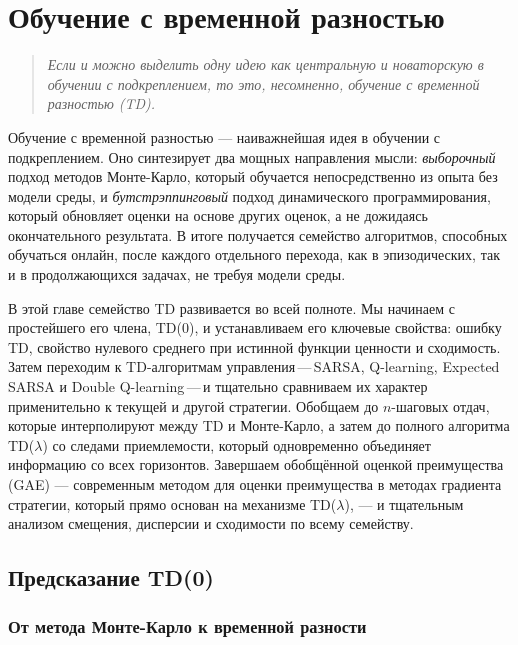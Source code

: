 \chapter{Обучение с временной разностью}
\label{ch:td}

\begin{quote}
\itshape
Если и можно выделить одну идею как центральную и новаторскую в обучении с подкреплением, то это, несомненно, обучение с временной разностью (TD).
\end{quote}

\bigskip

Обучение с временной разностью --- наиважнейшая идея в обучении с подкреплением.  Оно синтезирует два мощных направления мысли: \emph{выборочный} подход методов Монте-Карло, который обучается непосредственно из опыта без модели среды, и \emph{бутстрэппинговый} подход динамического программирования, который обновляет оценки на основе других оценок, а не дожидаясь окончательного результата.  В итоге получается семейство алгоритмов, способных обучаться онлайн, после каждого отдельного перехода, как в эпизодических, так и в продолжающихся задачах, не требуя модели среды.

В этой главе семейство TD развивается во всей полноте.  Мы начинаем с простейшего его члена, TD(0), и устанавливаем его ключевые свойства: ошибку TD, свойство нулевого среднего при истинной функции ценности и сходимость.  Затем переходим к TD-алгоритмам управления\,---\,SARSA, Q-learning, Expected SARSA и Double Q-learning\,---\,и тщательно сравниваем их характер применительно к текущей и другой стратегии.  Обобщаем до $n$-шаговых отдач, которые интерполируют между TD и Монте-Карло, а затем до полного алгоритма TD($\lambda$) со следами приемлемости, который одновременно объединяет информацию со всех горизонтов.  Завершаем обобщённой оценкой преимущества (GAE) --- современным методом для оценки преимущества в методах градиента стратегии, который прямо основан на механизме TD($\lambda$), --- и тщательным анализом смещения, дисперсии и сходимости по всему семейству.

\section{Предсказание TD(0)}
\label{sec:td0}

\subsection{От метода Монте-Карло к временной разности}

